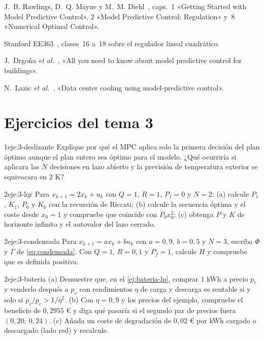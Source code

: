 \begin{lecturas}
\item J.~B. Rawlings, D.~Q. Mayne y M.~M. Diehl~\cite{rmd}, caps.~1 «Getting Started with Model Predictive Control», 2 «Model Predictive Control: Regulation» y~8 «Numerical Optimal Control».
\item Stanford EE363~\cite{ee363}, clases~16 a~18 sobre el regulador lineal cuadrático.
\item J.~Drgoňa \emph{et al.}~\cite{drgona}, «All you need to know about model predictive control for buildings».
\item N.~Lazic \emph{et al.}~\cite{lazic}, «Data center cooling using model-predictive control».
\end{lecturas}

\section*{Ejercicios del tema 3}

\begin{ejercicio}{1}{eje:3-deslizante}
Explique por qué el MPC aplica solo la primera decisión del plan óptimo aunque el plan entero sea óptimo para el modelo. ¿Qué ocurriría si aplicara las $N$ decisiones en lazo abierto y la previsión de temperatura exterior se equivocara en $2$ K?
\end{ejercicio}

\begin{ejercicio}{2}{eje:3-lqr}
Para $x_{k+1}=2x_k+u_k$ con $Q=1$, $R=1$, $P_f=0$ y $N=2$: (a) calcule $P_1$, $K_1$, $P_0$ y $K_0$ con la recursión de Riccati; (b) calcule la secuencia óptima y el coste desde $x_0=1$ y compruebe que coincide con $P_0x_0^{2}$; (c) obtenga $P$ y $K$ de horizonte infinito y el autovalor del lazo cerrado.
\end{ejercicio}

\begin{ejercicio}{2}{eje:3-condensada}
Para $x_{k+1}=ax_k+bu_k$ con $a=0{,}9$, $b=0{,}5$ y $N=3$, escriba $\Phi$ y $\Gamma$ de \eqref{eq:condensada}. Con $Q=1$, $R=0{,}1$ y $P_f=1$, calcule $H$ y compruebe que es definida positiva.
\end{ejercicio}

\begin{ejercicio}{2}{eje:3-bateria}
(a) Demuestre que, en el \cref{ej:bateria-lp}, comprar $1$ kWh a precio $p_c$ y venderlo después a $p_v$ con rendimientos $\eta$ de carga y descarga es rentable si y solo si $p_v/p_c>1/\eta^{2}$. (b) Con $\eta=0{,}9$ y los precios del ejemplo, compruebe el beneficio de $0{,}2955$ € y diga qué pasaría si el segundo par de precios fuera $(0{,}20;\ 0{,}24)$. (c) Añada un coste de degradación de $0{,}02$ € por kWh cargado o descargado (lado red) y recalcule.
\end{ejercicio}


